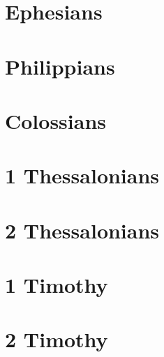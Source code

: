 \chapter{Ephesians}
\begin{multicols}{2}
  \raggedcolumns
  \parskip=0pt \relax
  
\end{multicols}

\chapter{Philippians}
\begin{multicols}{2}
  \raggedcolumns
  \parskip=0pt \relax
  
\end{multicols}

\chapter{Colossians}
\begin{multicols}{2}
  \raggedcolumns
  \parskip=0pt \relax
  
\end{multicols}

\chapter{1 Thessalonians}
\begin{multicols}{2}
  \raggedcolumns
  \parskip=0pt \relax
  
\end{multicols}

\chapter{2 Thessalonians}
\begin{multicols}{2}
  \raggedcolumns
  \parskip=0pt \relax
  
\end{multicols}

\chapter{1 Timothy}
\begin{multicols}{2}
  \raggedcolumns
  \parskip=0pt \relax
  
\end{multicols}

\chapter{2 Timothy}
\begin{multicols}{2}
  \raggedcolumns
  \parskip=0pt \relax
  
\end{multicols}

